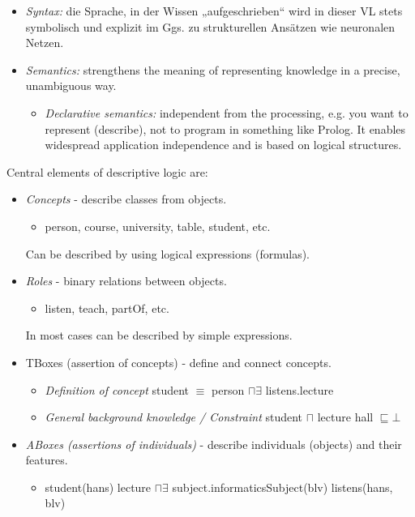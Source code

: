 \begin{itemize}
    \item \textit{Syntax:} die Sprache, in der Wissen „aufgeschrieben“ wird in dieser VL stets symbolisch und explizit im Ggs. zu strukturellen Ansätzen wie neuronalen Netzen.
    \item \textit{Semantics:} strengthens the meaning of representing knowledge in a precise, unambiguous way.
    \begin{itemize}
        \item \textit{Declarative semantics:} independent from the processing, e.g. you want to represent (describe), not to program in something like Prolog. It enables widespread application independence and is based on logical structures.
    \end{itemize}
\end{itemize}
Central elements of descriptive logic are:
\begin{itemize}
    \item \textit{Concepts} - describe classes from objects.
    \begin{itemize}
        \item person, course, university, table, student, etc.
    \end{itemize}
     Can be described by using logical expressions (formulas).
    \item \textit{Roles} - binary relations between objects.
    \begin{itemize}
        \item listen, teach, partOf, etc.
    \end{itemize}
    In most cases can be described by simple expressions. 
    \item TBoxes (assertion of concepts) - define and connect concepts.
    \begin{itemize}
        \item \textit{Definition of concept}\newline 
        student $\equiv$ person $\sqcap \exists$ listens.lecture  
        \item \textit{General background knowledge / Constraint}\newline
        student $\sqcap$ lecture hall $\sqsubseteq \bot$
    \end{itemize}
    \item \textit{ABoxes (assertions of individuals)} - describe individuals (objects) and their features.
        \begin{itemize}
            \item student(hans)\newline
            lecture $\sqcap \exists$ subject.informaticsSubject(blv)\newline
            listens(hans, blv)
        \end{itemize}
\end{itemize}

